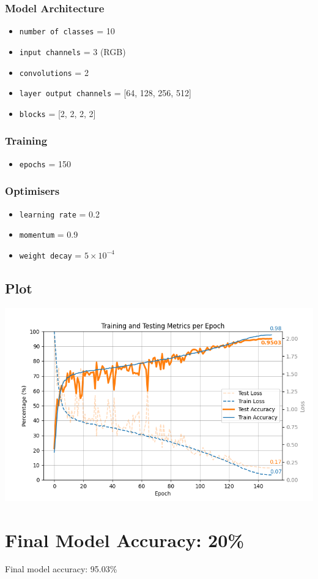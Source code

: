 \documentclass[12pt]{article}
\begin{document}
\begin{multicols}{2}
\subsubsection*{Model Architecture}
\begin{itemize}
    \item \texttt{number of classes} = 10
    \item \texttt{input channels} = 3 (RGB)
\end{itemize}

\vspace{0.3cm}

\begin{itemize}
    \item \texttt{convolutions} = 2
    \item \texttt{layer output channels} = [64, 128, 256, 512]
    \item \texttt{blocks} = [2, 2, 2, 2]
\end{itemize}

\subsubsection*{Training}
\begin{itemize}
    \item \texttt{epochs} = 150
\end{itemize}

\subsubsection*{Optimisers}
\begin{itemize}
    \item \texttt{learning rate} = 0.2
    \item \texttt{momentum} = 0.9
    \item \texttt{weight decay} = $5 \times 10^{-4}$
\end{itemize}
\end{multicols}

\fontsize{12}{12}\selectfont
\subsection{Plot}
\vspace{-0.5cm}
\begin{center}
\includegraphics[width=\textwidth]{metrics.png}
\end{center}

\vspace{-0.5cm}
\section{Final Model Accuracy: 20\%}
Final model accuracy: 95.03\%
\end{document}
